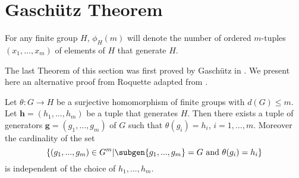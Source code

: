 \section{Gaschütz Theorem}

\begin{definition}
    For any finite group $H$, $\phi_H(m)$ will denote the number of ordered $m$-tuples $(x_1,...,x_m)$ of elements of $H$ that generate $H$.
\end{definition}

The last Theorem of this section was first proved by Gaschütz in \cite{GaschützZENGP}. We present here an alternative proof from Roquette adapted from \cite[p.~360]{FriedFA}.

\begin{theorem}
    Let $\theta : G \rightarrow H$ be a surjective homomorphism of finite groups with $d(G) \le m$. 
    Let $\mathbf{h} = (h_1, ..., h_m)$ be a tuple that generates $H$.
    Then there exists a tuple of generators $\mathbf{g}=(g_1, ..., g_m)$ of $G$ such that $\theta(g_i) = h_i$, $i = 1,...,m$.
    Moreover the cardinality of the set $$\left\{(g_1,...,g_m) \in G^m |\subgen{g_1,...,g_m} = G \text{ and } \theta(g_i) = h_i \right\}$$ is independent of the choice of $h_1, ..., h_m$.
\end{theorem}

